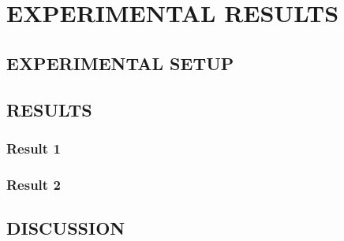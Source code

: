 \chapter{EXPERIMENTAL RESULTS}

\section{EXPERIMENTAL SETUP}

\section{RESULTS}

\subsection{Result 1}

\subsection{Result 2}

\section{DISCUSSION}
